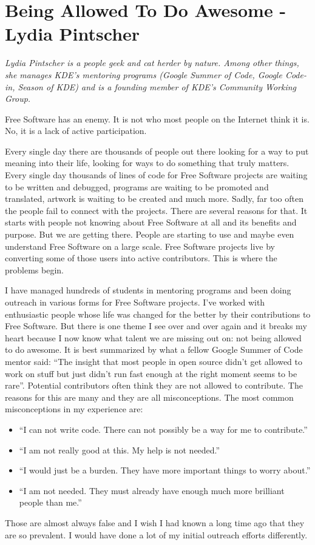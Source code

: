\chapter{Being Allowed To Do Awesome - Lydia Pintscher}

\textit{Lydia Pintscher is a people geek and cat herder by nature. Among other
things, she manages KDE's mentoring programs (Google Summer of Code, Google
Code-in, Season of KDE) and is a founding member of KDE's Community Working
Group.}

Free Software has an enemy. It is not who most people on the Internet think it
is. No, it is a lack of active participation.

Every single day there are thousands of people out there looking for a way to
put meaning into their life, looking for ways to do something that truly
matters. Every single day thousands of lines of code for Free Software projects
are waiting to be written and debugged, programs are waiting to be promoted and
translated, artwork is waiting to be created and much more. Sadly, far too often
the people fail to connect with the projects. There are several reasons for
that. It starts with people not knowing about Free Software at all and its
benefits and purpose. But we are getting there. People are starting to use and
maybe even understand Free Software on a large scale. Free Software projects
live by converting some of those users into active contributors. This is where
the problems begin.

I have managed hundreds of students in mentoring programs and been doing
outreach in various forms for Free Software projects. I've worked with
enthusiastic people whose life was changed for the better by their contributions
to Free Software. But there is one theme I see over and over again and it breaks
my heart because I now know what talent we are missing out on: not being allowed
to do awesome. It is best summarized by what a fellow Google Summer of Code
mentor said: ``The insight that most people in open source didn’t get allowed to
work on stuff but just didn’t run fast enough at the right moment seems to be
rare''. Potential contributors often think they are not allowed to contribute.
The reasons for this are many and they are all misconceptions. The most common
misconceptions in my experience are:
\begin{itemize}
 \item ``I can not write code. There can not possibly be a way for me to
contribute.''
 \item ``I am not really good at this. My help is not needed.''
 \item ``I would just be a burden. They have more important things to worry
about.''
 \item ``I am not needed. They must already have enough much more brilliant
people than me.''
\end{itemize}
Those are almost always false and I wish I had known a long time ago that they
are so prevalent. I would have done a lot of my initial outreach efforts
differently.

